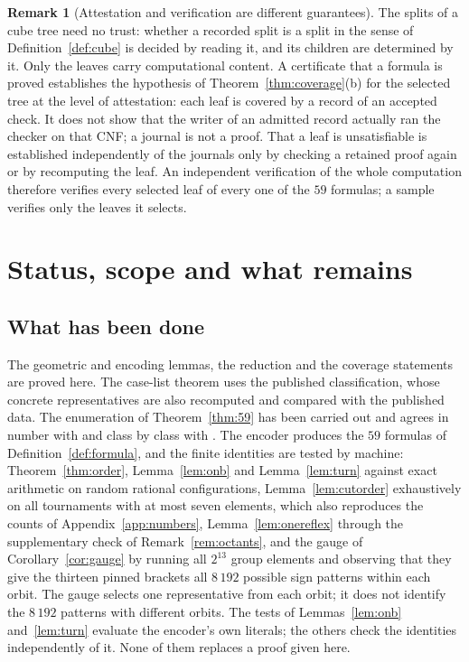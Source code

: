 \documentclass[11pt,reqno]{amsart}
\theoremstyle{plain}
\theoremstyle{definition}
\newtheorem{remark}[theorem]{Remark}
\begin{document}
\begin{remark}[Attestation and verification are different guarantees]\label{rem:attestation}
The splits of a cube tree need no trust: whether a recorded split is a split in the sense of
Definition~\ref{def:cube} is decided by reading it, and its children are determined by it. Only the
leaves carry computational content. A certificate that a formula is proved establishes the
hypothesis of Theorem~\ref{thm:coverage}(b) for the selected tree at the level of attestation: each
leaf is covered by a record of an accepted check. It does not show that the writer of an admitted
record actually ran the checker on that CNF; a journal is not a proof. That a leaf is
unsatisfiable is established independently of the journals only by checking a retained proof
again or by recomputing the leaf. An independent verification of the whole computation therefore
verifies every selected leaf of every one of the $59$ formulas; a sample verifies only the leaves
it selects.
\end{remark}

\section{Status, scope and what remains}\label{sec:status}

\subsection{What has been done}
The geometric and encoding lemmas, the reduction and the coverage statements are
proved here. The case-list theorem uses the published classification, whose concrete
representatives are also recomputed and compared with the published data. The enumeration of
Theorem~\ref{thm:59} has been carried out and agrees in number with
\cite{AltshulerBokowskiSchuchert1996} and class by class with \cite{LutzManifoldPage}. The encoder produces the $59$ formulas of
Definition~\ref{def:formula}, and the finite identities are tested by machine:
Theorem~\ref{thm:order}, Lemma~\ref{lem:onb} and Lemma~\ref{lem:turn} against exact arithmetic on
random rational configurations, Lemma~\ref{lem:cutorder} exhaustively on all tournaments with at most
seven elements, which also reproduces the counts of Appendix~\ref{app:numbers},
Lemma~\ref{lem:onereflex} through the supplementary check of Remark~\ref{rem:octants}, and
the gauge of Corollary~\ref{cor:gauge} by running all $2^{13}$ group elements and observing that they
give the thirteen pinned brackets all $8\,192$ possible sign patterns within each orbit. The gauge
selects one representative from each orbit; it does not identify the $8\,192$ patterns with
different orbits. The tests of Lemmas~\ref{lem:onb} and~\ref{lem:turn} evaluate the encoder's own
literals; the others check the identities independently of it. None of them replaces a proof given
here.
\end{document}

